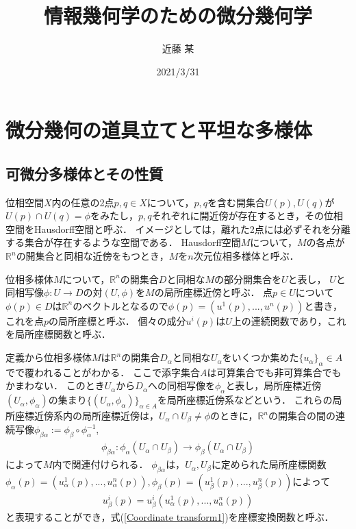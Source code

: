 \documentclass[dvipdfmx, a4paper,10pt]{jsarticle}
\title{情報幾何学のための微分幾何学}
\author{近藤 某}
\date{2021/3/31}
\theoremstyle{definition}
\newcommand{\eq}[1]{\begin{align}#1\end{align}}
\begin{document}
\maketitle
%

%
%
\section{微分幾何の道具立てと平坦な多様体}

%
%
\subsection{可微分多様体とその性質}
位相空間$X$内の任意の2点$p,q\in X$について，$p,q$を含む開集合$U(p),U(q)$が$U(p)\cap U(q)=\phi$をみたし，$p,q$それぞれに開近傍が存在するとき，その位相空間をHausdorff空間と呼ぶ．
イメージとしては，離れた2点には必ずそれを分離する集合が存在するような空間である．
Hausdorff空間$M$について，$M$の各点が$\mathbb{R}^n$の開集合と同相な近傍をもつとき，$M$を$n$次元位相多様体と呼ぶ．

位相多様体$M$について，$\mathbb{R}^n$の開集合$D$と同相な$M$の部分開集合を$U$と表し，
$U$と同相写像$\phi:U\rightarrow D$の対$(U,\phi)$を$M$の局所座標近傍と呼ぶ．
点$p\in U$について$\phi(p)\in D$は$\mathbb{R}^n$のベクトルとなるので$\phi(p)=\left(u^1(p),...,u^n(p)\right)$と書き，これを点$p$の局所座標と呼ぶ．
個々の成分$u^i(p)$は$U$上の連続関数であり，これを局所座標関数と呼ぶ．

定義から位相多様体$M$は$\mathbb{R}^n$の開集合$D_\alpha$と同相な$U_\alpha$をいくつか集めた$\{u_\alpha\}_\alpha\in A$でで覆われることがわかる．
ここで添字集合$A$は可算集合でも非可算集合でもかまわない．
このとき$U_\alpha$から$D_\alpha$への同相写像を$\phi_\alpha$と表し，局所座標近傍$(U_\alpha,\phi_\alpha)$の集まり$\{(U_\alpha,\phi_\alpha)\}_{\alpha\in A}$を局所座標近傍系などという．
これらの局所座標近傍系内の局所座標近傍は，$U_\alpha\cap U_\beta\neq\phi$のときに，$\mathbb{R}^n$の開集合の間の連続写像$\phi_{\beta\alpha}:=\phi_\beta\circ\phi^{-1}_\alpha$,
\eq{\phi_{\beta\alpha}:\phi_\alpha\left(U_\alpha\cap U_\beta\right)\rightarrow\phi_\beta\left(U_\alpha\cap U_\beta\right)}
によって$M$内で関連付けられる．
$\phi_{\beta\alpha}$は，$U_\alpha,U_\beta$に定められた局所座標関数$\phi_\alpha(p)=\left(u^1_\alpha(p),...,u^n_\alpha(p)\right),\phi_\beta(p)=\left(u^1_\beta(p),...,u^n_\beta(p)\right)$によって
\eq{u^i_\beta(p)=u^i_\beta(u^1_\alpha(p),...,u^n_\alpha(p))\label{Coordinate transform1}}
と表現することができ，式(\ref{Coordinate transform1})を座標変換関数と呼ぶ．
\end{document}
